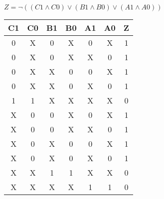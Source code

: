 
\begin{center}
    {\(Z = \lnot ((C1 \land C0) \lor (B1 \land B0) \lor (A1 \land A0)) \)}
    \begin{table}[h] %
        \begin{center}
            \begin{tabular}{|c|c|c|c|c|c||c|} \hline
            C1 & C0 & B1 & B0 & A1 & A0 & Z \\ \hline\hline
            0  & X  & 0  & X  & 0  & X  & 1 \\ \hline
            0  & X  & 0  & X  & X  & 0  & 1 \\ \hline
            0  & X  & X  & 0  & 0  & X  & 1 \\ \hline
            0  & X  & X  & 0  & X  & 0  & 1 \\ \hline
            1  & 1  & X  & X  & X  & X  & 0 \\ \hline
            X  & 0  & 0  & X  & 0  & X  & 1 \\ \hline
            X  & 0  & 0  & X  & X  & 0  & 1 \\ \hline
            X  & 0  & X  & 0  & 0  & X  & 1 \\ \hline
            X  & 0  & X  & 0  & X  & 0  & 1 \\ \hline
            X  & X  & 1  & 1  & X  & X  & 0 \\ \hline
            X  & X  & X  & X  & 1  & 1  & 0 \\ \hline
            \end{tabular}
        \end{center}
    \end{table}
\end{center}
